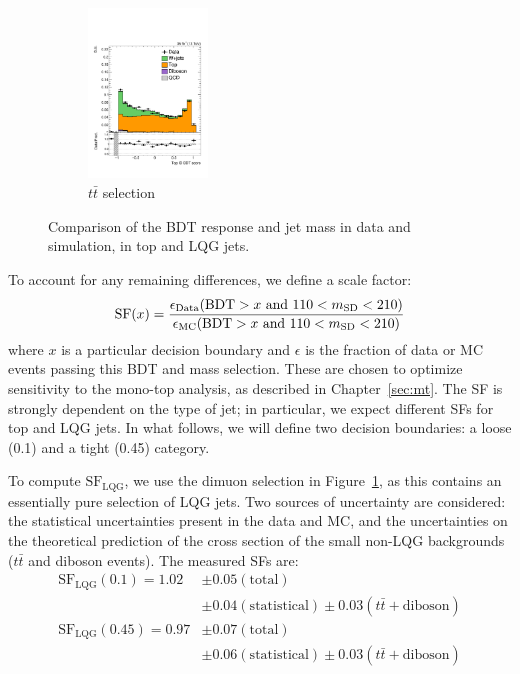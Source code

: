 \begin{figure}[]
\begin{center}
\begin{subfigure}[t]{\textwidth}
\begin{center}
            \includegraphics[width=0.35\textwidth]{figures/toptagging/sf/singlemuontop_top_ecf_bdt.pdf}
            \caption{$t\bar{t}$ selection}
    \end{center}
        \end{subfigure}
        \caption{Comparison of the BDT response and jet mass in data and simulation, in top and LQG jets.}
        \label{fig:jets:bdtdist}
    \end{center}
\end{figure}

To account for any remaining differences, we define a scale factor:
\begin{equation}
    \mathrm{SF}(x) = \frac{\epsilon_\mathrm{Data}(\mathrm{BDT}>x \text{ and }110<m_{\mathrm{SD}}<210)}{\epsilon_\mathrm{MC}(\mathrm{BDT}>x \text{ and }110<m_{\mathrm{SD}}<210)}
\end{equation}
where $x$ is a particular decision boundary and $\epsilon$ is the fraction of data or MC events passing this BDT  and mass selection.
These are chosen to optimize sensitivity to the mono-top analysis, as described in Chapter~\ref{sec:mt}.
The SF is strongly dependent on the type of jet; in particular, we expect different SFs for top and LQG jets.
In what follows, we will define two decision boundaries: a loose (0.1) and a tight (0.45) category.

To compute $\mathrm{SF}_\mathrm{LQG}$, we use the dimuon selection in Figure~\ref{fig:jets:bdtdist}, as this contains an essentially pure selection of LQG jets.
Two sources of uncertainty are considered: the statistical uncertainties present in the data and MC, and the uncertainties on the theoretical prediction of the cross section of the small non-LQG backgrounds ($t\bar{t}$ and diboson events).
The measured SFs are:
\begin{align}
    \mathrm{SF}_\mathrm{LQG}(0.1) = 1.02 & \pm 0.05 (\mathrm{total}) \nonumber \\ 
                                         & \pm 0.04 (\mathrm{statistical}) \pm 0.03 (t\bar{t}+\mathrm{diboson}) \nonumber \\ 
    \mathrm{SF}_\mathrm{LQG}(0.45) = 0.97 & \pm 0.07 (\mathrm{total}) \nonumber \\ 
                                         & \pm 0.06 (\mathrm{statistical}) \pm 0.03 (t\bar{t}+\mathrm{diboson})
\end{align}

